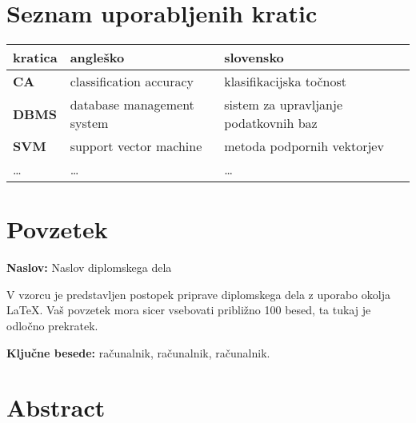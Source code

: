 \documentclass[a4paper, 12pt]{book}
\newcommand{\ttitle}{Naslov diplomskega dela}
\newcommand{\tkeywords}{računalnik, računalnik, računalnik}
\newcommand{\clearemptydoublepage}{\newpage{\pagestyle{empty}\cleardoublepage}}
\begin{document}
\clearemptydoublepage

\pagestyle{empty}
\def\thepage{} %
\tableofcontents{}


\clearemptydoublepage


\chapter*{Seznam uporabljenih kratic}

\begin{tabular}{l|l|l}
  {\bf kratica} & {\bf angleško} & {\bf slovensko} \\ \hline
  {\bf CA} & classification accuracy & klasifikacijska točnost \\
  {\bf DBMS} & database management system & sistem za upravljanje podatkovnih baz \\
  {\bf SVM} & support vector machine & metoda podpornih vektorjev \\
  \dots & \dots & \dots \\
\end{tabular}



\clearemptydoublepage

\chapter*{Povzetek}

\noindent\textbf{Naslov:} \ttitle
\bigskip

\noindent V vzorcu je predstavljen postopek priprave diplomskega dela z uporabo okolja \LaTeX. Vaš povzetek mora sicer vsebovati približno 100 besed, ta tukaj je odločno prekratek.
\bigskip

\noindent\textbf{Ključne besede:} \tkeywords.
\clearemptydoublepage

\chapter*{Abstract}
\end{document}
